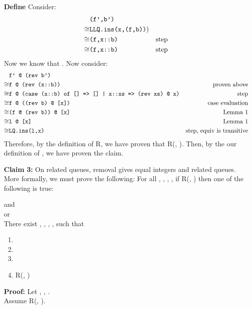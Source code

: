 \documentclass[11pt,letterpaper]{article}
\begin{document}
\textbf{Define} 
Consider:
\begin{align*}
      & \texttt{(f',b')} &\\
\cong & \texttt{LLQ.ins(x,(f,b))}) &\\
\cong & \texttt{(f,x::b)} & \text{step} \\
\cong & \texttt{(f,x::b)} & \text{step} \\
\end{align*}
Now we know that .
Now consider:
\begin{align*}
      & \texttt{f' @ (rev b')} & \\
\cong & \texttt{f @ (rev (x::b))} &\text{proven above} \\
\cong & \texttt{f @ (case (x::b) of [] => [] | x::xs => (rev xs) @ x)} &\text{step} \\
\cong & \texttt{f @ ((rev b) @ [x])} &\text{case evaluation} \\
\cong & \texttt{(f @ (rev b)) @ [x]} &\text{Lemma 1} \\
\cong & \texttt{l @ [x]} &\text{Lemma 1} \\
\cong & \texttt{LQ.ins(l,x)} &\text{step, equiv is transitive} \\
\end{align*}
Therefore, by the definition of R, we have proven that R(, ).
Then, by the our definition of , we have proven the claim. 

\textbf{Claim 3:} On related queues, removal gives equal integers and related queues.\\
More formally, we must prove the following:
For all , , , , if R(, ) then one of the
following is true:

 and \\
or\\
There exist , , , , such that
\begin{enumerate}
\item {}
\item {}
\item {}
\item R(, )
\end{enumerate}

\textbf{Proof:}
Let , , .\\
Assume R(, ).
\end{document}
